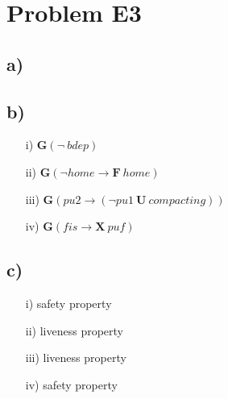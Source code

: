 \documentclass[12pt]{article}
\begin{document}
\section*{Problem E3}
\subsection*{a)}

\newpage

\subsection*{b)}
\begin{itemize}
	\item[i)] $ \mathbf{G}( \neg \: bdep )$
	\item[ii)] $ \mathbf{G} ( \neg home \rightarrow \mathbf{F} \: home ) $
	\item[iii)] $ \mathbf{G} (pu2 \rightarrow ( \neg pu1 \: \mathbf{U} \: compacting ) ) $
	\item[iv)] $ \mathbf{G} (fis \rightarrow \mathbf{X} \: puf )$
\end{itemize}

\subsection*{c)}
\begin{itemize}
	\item[i)] safety property
	\vspace{4cm}
	\item[ii)] liveness property
	\item[iii)] liveness property
	\item[iv)] safety property
	\vspace{4cm}
\end{itemize}
\end{document}
